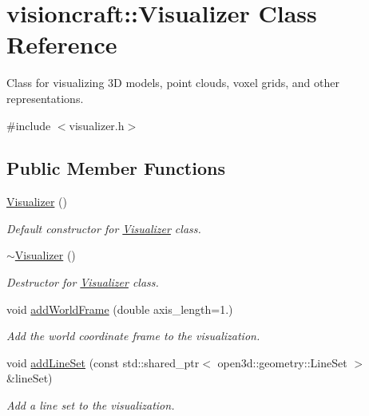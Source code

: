 \hypertarget{classvisioncraft_1_1Visualizer}{}\section{visioncraft\+:\+:Visualizer Class Reference}
\label{classvisioncraft_1_1Visualizer}


Class for visualizing 3D models, point clouds, voxel grids, and other representations.  




{\ttfamily \#include $<$visualizer.\+h$>$}

\subsection*{Public Member Functions}
\begin{DoxyCompactItemize}
\item 
\hyperlink{classvisioncraft_1_1Visualizer_ae8779e7a8cddce5d4a864d048b0c3d2f}{Visualizer} ()
\begin{DoxyCompactList}\small\item\em Default constructor for \hyperlink{classvisioncraft_1_1Visualizer}{Visualizer} class. \end{DoxyCompactList}\item 
\hyperlink{classvisioncraft_1_1Visualizer_a4235c5bd54d8814a5c671803b205e702}{$\sim$\+Visualizer} ()
\begin{DoxyCompactList}\small\item\em Destructor for \hyperlink{classvisioncraft_1_1Visualizer}{Visualizer} class. \end{DoxyCompactList}\item 
void \hyperlink{classvisioncraft_1_1Visualizer_adfda4bb9218cd572652b6ff3706add2b}{add\+World\+Frame} (double axis\+\_\+length=1.)
\begin{DoxyCompactList}\small\item\em Add the world coordinate frame to the visualization. \end{DoxyCompactList}\item 
void \hyperlink{classvisioncraft_1_1Visualizer_a422ba320557820447ddc56226279af24}{add\+Line\+Set} (const std\+::shared\+\_\+ptr$<$ open3d\+::geometry\+::\+Line\+Set $>$ \&line\+Set)
\begin{DoxyCompactList}\small\item\em Add a line set to the visualization. \end{DoxyCompactList}\item 

\end{DoxyCompactItemize}
